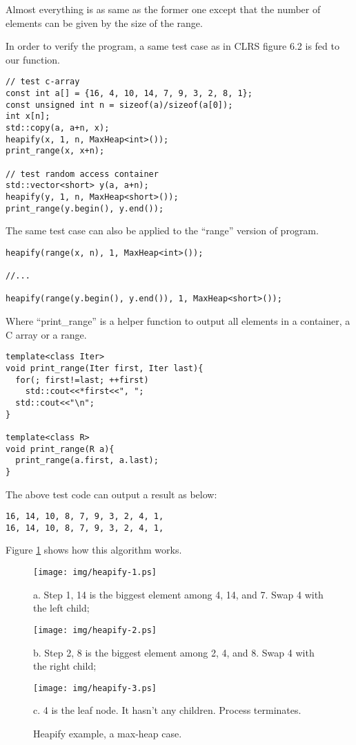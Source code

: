 \documentclass{article}
\begin{document}
Almost everything is as same as the former one except that the number
of elements can be given by the size of the range.

In order to verify the program, a same test case as in CLRS figure 6.2
is fed to our function.

\begin{lstlisting}
// test c-array
const int a[] = {16, 4, 10, 14, 7, 9, 3, 2, 8, 1};
const unsigned int n = sizeof(a)/sizeof(a[0]);
int x[n];
std::copy(a, a+n, x);
heapify(x, 1, n, MaxHeap<int>());
print_range(x, x+n);

// test random access container
std::vector<short> y(a, a+n);
heapify(y, 1, n, MaxHeap<short>());
print_range(y.begin(), y.end());
\end{lstlisting}

The same test case can also be applied to the ``range'' version of
program.

\begin{lstlisting}
heapify(range(x, n), 1, MaxHeap<int>());

//...

heapify(range(y.begin(), y.end()), 1, MaxHeap<short>());
\end{lstlisting}

Where ``print\_range'' is a helper function to output all elements
in a container, a C array or a range.

\begin{lstlisting}
template<class Iter>
void print_range(Iter first, Iter last){
  for(; first!=last; ++first)
    std::cout<<*first<<", ";
  std::cout<<"\n";
}

template<class R>
void print_range(R a){
  print_range(a.first, a.last);
}
\end{lstlisting}

The above test code can output a result as below:

\begin{verbatim}
16, 14, 10, 8, 7, 9, 3, 2, 4, 1, 
16, 14, 10, 8, 7, 9, 3, 2, 4, 1,
\end{verbatim}

Figure \ref{fig:heapify} shows how this algorithm works.

\begin{figure}[htbp]
  \begin{center}
    \texttt{[image: img/heapify-1.ps]}

    a. Step 1, 14 is the biggest element among 4, 14, and 7. Swap 4 with the left child;

    \texttt{[image: img/heapify-2.ps]}

    b. Step 2, 8 is the biggest element among 2, 4, and 8. Swap 4 with the right child;

    \texttt{[image: img/heapify-3.ps]}

    c. 4 is the leaf node. It hasn't any children. Process terminates.
    \caption{Heapify example, a max-heap case.} \label{fig:heapify}
  \end{center}
\end{figure}
\end{document}
